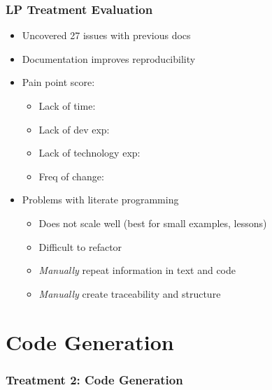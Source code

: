 \documentclass[usenames,dvipsnames]{beamer}
\newcommand{\cross}{{\LARGE {\color{red}\ding{55}}}}
\newcommand{\greencheck}{{\LARGE {\color{ForestGreen}\checkmark}}}
\newcommand{\bluedash}{{\LARGE {\color{blue}{--}}}}
\begin{document}
\begin{frame}
  
  \frametitle{LP Treatment Evaluation}
  
  \begin{itemize}
  \item Uncovered 27 issues with previous docs
  \item Documentation improves reproducibility
  \item Pain point score:
  \begin{itemize}
    \item Lack of time: \greencheck %
    \item Lack of dev exp: \bluedash %
    \item Lack of technology exp: \cross %
    \item Freq of change: \greencheck %
  \end{itemize}
  \item Problems with literate programming
  \begin{itemize}
    \item Does not scale well (best for small examples, lessons) %
    \item Difficult to refactor
    \item \emph{Manually} repeat information in text and code
    \item \emph{Manually} create traceability and structure
  \end{itemize}
  \end{itemize}

\end{frame}
  

\section[Code Gen]{Code Generation}


\begin{frame}

  \frametitle{Treatment 2: Code Generation}
  
  \hspace{2cm}


  
\end{frame}
  
\end{document}
